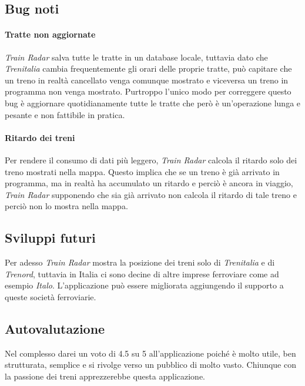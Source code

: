 \documentclass[a4paper,10pt]{article}
\begin{document}
  \subsection{Bug noti}
    \paragraph{Tratte non aggiornate}
      \emph{Train Radar} salva tutte le tratte in un database locale, tuttavia dato che \emph{Trenitalia} cambia frequentemente gli orari delle proprie tratte, può capitare che un treno in realtà cancellato venga comunque mostrato e viceversa un treno in programma non venga mostrato. Purtroppo l'unico modo per correggere questo bug è aggiornare quotidianamente tutte le tratte che però è un'operazione lunga e pesante e non fattibile in pratica.

    \paragraph{Ritardo dei treni}
      Per rendere il consumo di dati più leggero, \emph{Train Radar} calcola il ritardo solo dei treno mostrati nella mappa. Questo implica che se un treno è già arrivato in programma, ma in realtà ha accumulato un ritardo e perciò è ancora in viaggio, \emph{Train Radar} supponendo che sia già arrivato non calcola il ritardo di tale treno e perciò non lo mostra nella mappa.

  \subsection{Sviluppi futuri}
    Per adesso \emph{Train Radar} mostra la posizione dei treni solo di \emph{Trenitalia} e di \emph{Trenord}, tuttavia in Italia ci sono decine di altre imprese ferroviare come ad esempio \emph{Italo}. L'applicazione può essere migliorata aggiungendo il supporto a queste società ferroviarie.

  \subsection{Autovalutazione}
    Nel complesso darei un voto di 4.5 su 5 all'applicazione poiché è molto utile, ben strutturata, semplice e si rivolge verso un pubblico di molto vasto. Chiunque con la passione dei treni apprezzerebbe questa applicazione.

\medskip

\printbibliography
\end{document}
